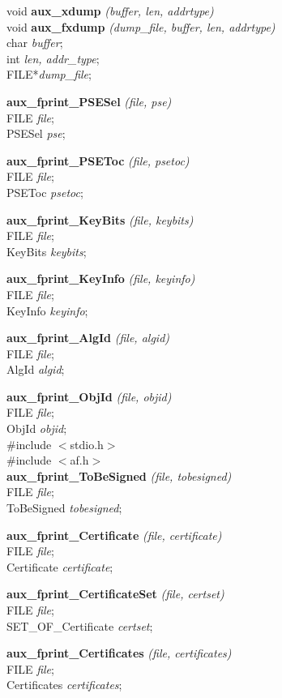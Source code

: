 void {\bf aux\_xdump} {\em (buffer, len, addrtype)}  \\
void {\bf aux\_fxdump} {\em (dump\_file, buffer, len, addrtype)}  \\
char {\em *buffer}; \\
int  {\em len, addr\_type}; \\
FILE*{\em dump\_file};

{\bf aux\_fprint\_PSESel} {\em (file, pse)} \\
FILE {\em *file}; \\
PSESel {\em *pse};

{\bf aux\_fprint\_PSEToc} {\em (file, psetoc)} \\
FILE {\em *file}; \\
PSEToc {\em *psetoc};

{\bf aux\_fprint\_KeyBits} {\em (file, keybits)} \\
FILE {\em *file}; \\
KeyBits {\em *keybits};

{\bf aux\_fprint\_KeyInfo} {\em (file, keyinfo)} \\
FILE {\em *file}; \\
KeyInfo {\em *keyinfo};

{\bf aux\_fprint\_AlgId} {\em (file, algid)} \\
FILE {\em *file}; \\
AlgId {\em *algid};

{\bf aux\_fprint\_ObjId} {\em (file, objid)} \\
FILE {\em *file}; \\
ObjId {\em *objid};
\\ [1em]
\#include $<$stdio.h$>$ \\
\#include $<$af.h$>$ \\ [1em]
{\bf aux\_fprint\_ToBeSigned} {\em (file, tobesigned)} \\
FILE {\em *file}; \\
ToBeSigned {\em *tobesigned};

{\bf aux\_fprint\_Certificate} {\em (file, certificate)} \\
FILE {\em *file}; \\
Certificate {\em *certificate};

{\bf aux\_fprint\_CertificateSet} {\em (file, certset)} \\
FILE {\em *file}; \\
SET\_OF\_Certificate {\em *certset};

{\bf aux\_fprint\_Certificates} {\em (file, certificates)} \\
FILE {\em *file}; \\
Certificates {\em *certificates};

